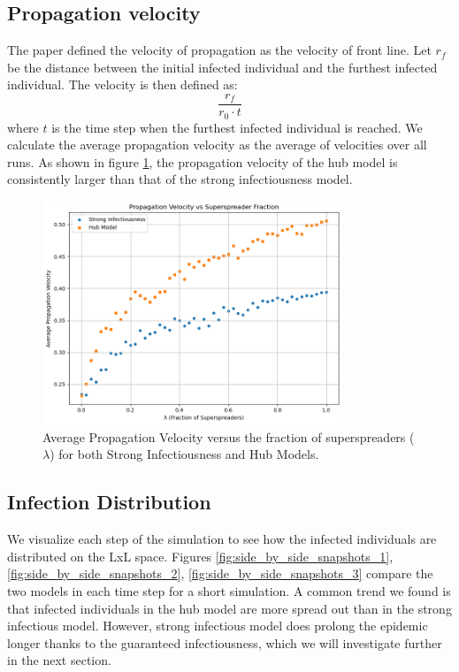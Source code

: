 \documentclass{article}
\begin{document}
\subsection{Propagation velocity}
The paper defined the velocity of propagation as the velocity of front line. Let \(r_f\) be the distance between the initial infected individual and the furthest infected individual. The velocity is then defined as:
\[
\frac{r_f}{r_0 \cdot t}
\]
where \(t\) is the time step when the furthest infected individual is reached. We calculate the average propagation velocity as the average of velocities over all runs. As shown in figure \ref{fig:propagation_speed}, the propagation velocity of the hub model is consistently larger than that of the strong infectiousness model. 
\begin{figure}[!htbp]
    \centering
    \includegraphics[width=0.8\textwidth]{fig/velocity.png} %
    \caption{Average Propagation Velocity versus the fraction of superspreaders (\(\lambda\)) for both Strong Infectiousness and Hub Models.}
    \label{fig:propagation_speed}
\end{figure}

\subsection{Infection Distribution}
We visualize each step of the simulation to see how the infected individuals are distributed on the LxL space. Figures \ref{fig:side_by_side_snapshots_1}, \ref{fig:side_by_side_snapshots_2}, \ref{fig:side_by_side_snapshots_3} compare the two models in each time step for a short simulation. A common trend we found is that infected individuals in the hub model are more spread out than in the strong infectious model. However, strong infectious model does prolong the epidemic longer thanks to the guaranteed infectiousness, which we will investigate further in the next section.
\end{document}

